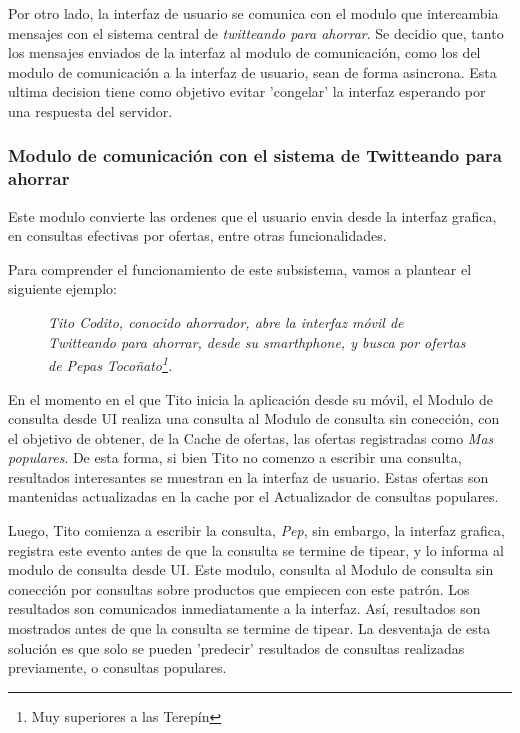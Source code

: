 Por otro lado, la interfaz de usuario se comunica con el modulo que intercambia mensajes con el sistema central de \emph{twitteando para ahorrar}. Se decidio que, tanto los mensajes enviados de la interfaz al modulo de comunicación, como los del modulo de comunicación a la interfaz de usuario, sean de forma asincrona. Esta ultima decision tiene como objetivo evitar 'congelar' la interfaz esperando por una respuesta del servidor. 

\subsubsection{Modulo de comunicación con el sistema de Twitteando para ahorrar}

Este modulo convierte las ordenes que el usuario envia desde la interfaz grafica, en consultas efectivas por ofertas, entre otras funcionalidades. 

Para comprender el funcionamiento de este subsistema, vamos a plantear el siguiente ejemplo:

\begin{figure}[H]
	\centering
	\emph{Tito Codito, conocido ahorrador, abre la interfaz móvil de Twitteando para ahorrar, desde su smarthphone, y busca por ofertas de \emph{Pepas Tocoñato}\footnote{Muy superiores a las Terepín}.}
\end{figure}

En el momento en el que Tito inicia la aplicación desde su móvil, el \textsf{Modulo de consulta desde UI} realiza una consulta al \textsf{Modulo de consulta sin conección}, con el objetivo de obtener, de la \textsf{Cache de ofertas}, las ofertas registradas como \emph{Mas populares}. De esta forma, si bien Tito no comenzo a escribir una consulta, resultados interesantes se muestran en la interfaz de usuario. Estas ofertas son mantenidas actualizadas en la cache por el \textsf{Actualizador de consultas populares}.

Luego, Tito comienza a escribir la consulta, \emph{Pep}, sin embargo, la interfaz grafica, registra este evento antes de que la consulta se termine de tipear, y lo informa al \textsf{modulo de consulta desde UI}. Este modulo, consulta al \textsf{Modulo de consulta sin conección} por consultas sobre productos que empiecen con este patrón. Los resultados son comunicados inmediatamente a la interfaz. Así, resultados son mostrados antes de que la consulta se termine de tipear. La desventaja de esta solución es que solo se pueden 'predecir' resultados de consultas realizadas previamente, o consultas populares. 

